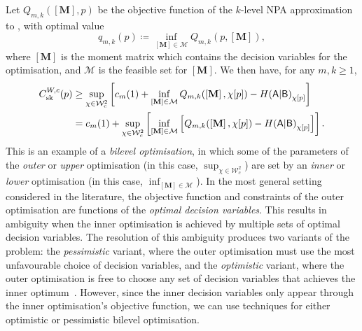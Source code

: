 \documentclass[10pt, a4paper]{article}
\numberwithin{equation}{section} %
\theoremstyle{definition}
\theoremstyle{plain}
\newcommand{\?}{\mathrel{?}} %
\newcommand{\matr}[2][]{\left[\mathbf{#2}#1\right]} %
\newcommand{\sM}{\mathcal{M}}
\newcommand{\sW}{\mathcal{W}}
\newcommand{\crv}[1]{\mathsf{#1}}
\newcommand{\sk}{\rm sk}
\begin{document}
                  Let \(Q_{m,k}(\matr{M}, p)\) be the objective function of the \(k\)-level NPA approximation to , with optimal value
                  \begin{equation}
                    q_{m,k}(p) \coloneqq \inf_{\matr{M}\in\sM} Q_{m,k}(p, \matr{M}),
                  \end{equation}
                  where \(\matr{M}\) is the moment matrix which contains the decision variables for the optimisation, and \(\sM\) is the feasible set for \(\matr{M}\). We then have, for any \(m,k\geq 1\),
                  \begin{align}
                    C^{W,c}_{\sk}(p) &\geq \sup_{\chi\in\sW_c^2} \left[ c_m(1) + \inf_{\matr{M}\in\sM} Q_{m,k}(\matr{M}, \chi[p]) - H{(\crv{A}|\crv{B})}_{\chi[p]} \right] \\
                                 &= c_m(1) + \sup_{\chi\in\sW_c^2} \left[ \inf_{\matr{M}\in\sM} \left[ Q_{m,k}(\matr{M}, \chi[p]) - H{(\crv{A}|\crv{B})}_{\chi[p]} \right] \right].
                  \end{align}
                  This is an example of a \emph{bilevel optimisation}, in which some of the parameters of the \emph{outer} or \emph{upper} optimisation (in this case, \(\sup_{\chi\in\sW_c^2}\)) are set by an \emph{inner} or \emph{lower} optimisation (in this case, \(\inf_{\matr{M}\in\sM}\)). In the most general setting considered in the literature, the objective function and constraints of the outer optimisation are functions of the \emph{optimal decision variables}. This results in ambiguity when the inner optimisation is achieved by multiple sets of optimal decision variables. The resolution of this ambiguity produces two variants of the problem: the \emph{pessimistic} variant, where the outer optimisation must use the most unfavourable choice of decision variables, and the \emph{optimistic} variant, where the outer optimisation is free to choose any set of decision variables that achieves the inner optimum~\cite{BilevelReview}. However, since the inner decision variables only appear through the inner optimisation's objective function, we can use techniques for either optimistic or pessimistic bilevel optimisation.
\end{document}
